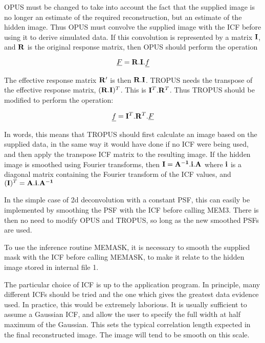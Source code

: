 OPUS must be changed to take into account the fact that the supplied image is
no  longer an estimate of the required reconstruction, but an estimate of the
hidden  image. Thus OPUS must convolve the supplied image with the ICF before
using it  to derive simulated data. If this convolution is represented by a
matrix  ${\bf I}$, and ${\bf R}$ is the original response matrix, then OPUS
should  perform the operation

\begin {equation}
\underline{F}={\bf R}.{\bf I}.\underline{f}
\end {equation}

The effective response matrix ${\bf R}'$ is then ${\bf R}.{\bf I}$. TROPUS
needs  the transpose of the effective response matrix, $({\bf R}.{\bf I})^{T}$.
This is ${\bf I}^{T}.{\bf R}^{T}$. Thus TROPUS should be modified to perform
the  operation:

\begin {equation}
\underline{f}={\bf I}^{T}.{\bf R}^{T}.\underline{F}
\end {equation}

In words, this means that TROPUS should first calculate an image based on the
supplied data, in the same way it would have done if no ICF were being used, and
then apply the transpose ICF matrix to the resulting image. If the hidden image
is smoothed using Fourier transforms, then ${\bf I}={\bf A^{-1}}.{\bf i}.{\bf
A}$ where ${\bf i}$ is a diagonal matrix containing the Fourier transform of the
ICF values, and $({\bf I})^{T}={\bf A}.{\bf i}.{\bf A^{-1}}$

In the simple case of 2d deconvolution with a constant PSF, this can easily be
implemented by smoothing the PSF with the ICF before calling MEM3. There is
then  no need to modify OPUS and TROPUS, so long as the new smoothed PSFs are
used.

To use the inference routine MEMASK, it is necessary to smooth the supplied
mask  with the ICF before calling MEMASK, to make it relate to the hidden image
stored in internal file 1.

The particular choice of ICF is up to the application program. In principle,
many different ICFs should be tried and the one which gives the greatest data
evidence used. In practice, this would be extremely laborious. It is usually
sufficient to assume a Gaussian ICF, and allow the user to specify the full
width at half maximum of the Gaussian. This sets the typical correlation length
expected in the final reconstructed image. The image will tend to be smooth on
this scale.

